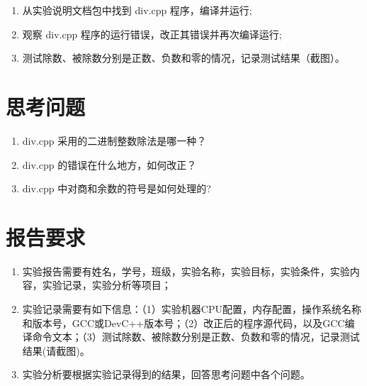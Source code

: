 \begin{enumerate}
	\item 从实验说明文档包中找到 div.cpp 程序，编译并运行;
	\item 观察 div.cpp 程序的运行错误，改正其错误并再次编译运行;
	\item 测试除数、被除数分别是正数、负数和零的情况，记录测试结果（截图）。
\end{enumerate}

\section{思考问题}

\begin{enumerate}
	\item div.cpp 采用的二进制整数除法是哪一种？
	\item div.cpp 的错误在什么地方，如何改正？
	\item div.cpp 中对商和余数的符号是如何处理的?
\end{enumerate}

\section{报告要求}

\begin{enumerate}
	\item 实验报告需要有姓名，学号，班级，实验名称，实验目标，实验条件，实验内容，实验记录，实验分析等项目；
	\item 实验记录需要有如下信息：（1）实验机器CPU配置，内存配置，操作系统名称和版本号，GCC或DevC++版本号；（2）改正后的程序源代码，以及GCC编译命令文本；（3）测试除数、被除数分别是正数、负数和零的情况，记录测试结果(请截图)。
	\item 实验分析要根据实验记录得到的结果，回答思考问题中各个问题。
\end{enumerate}

